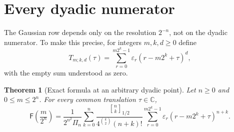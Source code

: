\documentclass[11pt,oneside,openany]{book}
\newtheorem{theorem}{Theorem}[chapter]
\theoremstyle{definition}
\theoremstyle{remark}
\newcommand{\Qbinom}[3]{\genfrac{[}{]}{0pt}{}{#1}{#2}_{#3}}
\newcommand{\eps}{\varepsilon}
\newcommand{\C}{\mathbb C}
\newcommand{\Fab}{\mathsf F}
\begin{document}
\section{Every dyadic numerator}

The Gaussian row depends only on the resolution $2^{-n}$, not on the dyadic
numerator.  To make this precise, for integers $m,k,d\ge0$ define
\begin{equation}\label{eq:fabius-long-block}
 T_{m;k,d}(\tau)=
 \sum_{r=0}^{m2^k-1}\eps_r(r-m2^k+\tau)^d,
\end{equation}
with the empty sum understood as zero.

\begin{theorem}[Exact formula at an arbitrary dyadic point]\label{thm:fabius-arbitrary-dyadic}
Let $n\ge0$ and $0\le m\le2^n$.  For every common translation
$\tau\in\C$,
\begin{equation}\label{eq:fabius-arbitrary-dyadic}
\boxed{
 \Fab\!\left(\frac m{2^n}\right)=
 \frac1{2^{n^2}\Pi_n}
 \sum_{k=0}^n
 \frac{\Qbinom nk{1/2}}{4^{\binom k2}(n+k)!}
 \sum_{r=0}^{m2^k-1}\eps_r(r-m2^k+\tau)^{n+k}.}
\end{equation}
\end{theorem}
\end{document}
